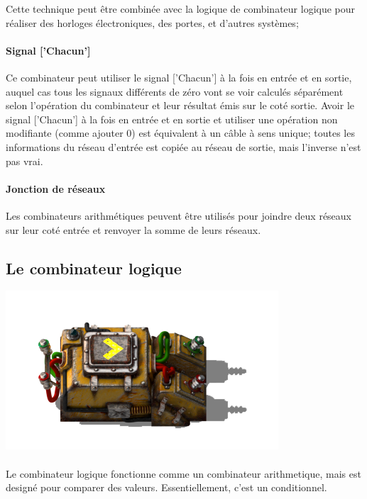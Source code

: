 Cette technique peut être combinée avec la logique de combinateur logique pour réaliser des horloges électroniques, des portes, et d'autres systèmes;

\paragraph{Signal ['Chacun']}
Ce combinateur peut utiliser le signal ['Chacun'] à la fois en entrée et en sortie, auquel cas tous les signaux différents de zéro vont se voir calculés séparément selon l'opération du combinateur et leur résultat émis sur le coté sortie.
Avoir le signal ['Chacun'] à la fois en entrée et en sortie et utiliser une opération non modifiante (comme ajouter 0) est équivalent à un câble à sens unique; toutes les informations du réseau d'entrée est copiée au réseau de sortie, mais l'inverse n'est pas vrai.

\paragraph{Jonction de réseaux}
Les combinateurs arithmétiques peuvent être utilisés pour joindre deux réseaux sur leur coté entrée et renvoyer la somme de leurs réseaux.

\subsection{Le combinateur logique}
\begin{minipage}[t]{\textwidth}

{
\centering
\includegraphics{pics/factorio-decider.png}
}

\end{minipage} 

\paragraph{}
Le combinateur logique fonctionne comme un combinateur arithmetique, mais est designé pour comparer des valeurs.
Essentiellement, c'est un conditionnel.

